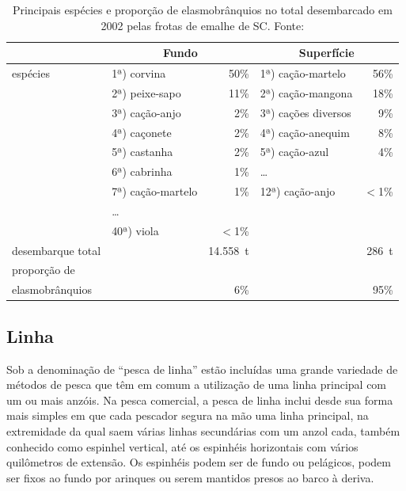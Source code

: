 \documentclass[a4paper,11pt,twoside,showtrims,onecolumn,openright,final]{memoir}
\begin{document}
\begin{table}
\caption[Principais espécies e proporção de elasmobrânquios no total desembarcado em 2002
         pelas frotas de emalhe de SC.]
	{Principais espécies e proporção de elasmobrânquios no total desembarcado em 2002
         pelas frotas de emalhe de SC. Fonte: \citet{univali2003}}
\label{tab:capturas-emalhe-sc}
\begin{center}
\begin{tabular*}{\textwidth}{l@{\extracolsep{\fill}}lrlr}
\toprule
		& \multicolumn{2}{c}{Fundo} & \multicolumn{2}{c}{Superfície} \\
\midrule
espécies 	& 1ª) corvina		& 50\%	& 1ª) cação-martelo	  & 56\%	\\
		& 2ª) peixe-sapo	& 11\%	& 2ª) cação-mangona	  & 18\%	\\
		& 3ª) cação-anjo	& 2\%	& 3ª) cações diversos	  & 9\%		\\
		& 4ª) caçonete		& 2\%	& 4ª) cação-anequim   	  & 8\%		\\
		& 5ª) castanha		& 2\%	& 5ª) cação-azul 	  & 4\%		\\
		& 6ª) cabrinha		& 1\%	& \ldots 		  &		\\
		& 7ª) cação-martelo	& 1\%	& 12ª) cação-anjo  	  & $<$1\%	\\
		& \ldots 		& 	&  			  &		\\
		& 40ª) viola		& $<$1\%&  		  	  & 		\\
\midrule
desembarque total & 			& 14.558~t& 			  & 286~t	\\
\midrule
proporção de	& 			&	& 			  & 		\\
elasmobrânquios	& 			& 6\%	& 			  & 95\%	\\
\bottomrule
\end{tabular*}
\end{center}
\end{table}


\subsection*{Linha}

Sob a denominação de ``pesca de linha'' estão incluídas uma grande variedade de métodos 
de pesca que têm em comum a utilização de uma linha principal com um ou mais anzóis. 
Na pesca comercial, a pesca de linha inclui desde sua forma mais simples em que cada pescador 
segura na mão uma linha principal, na extremidade da qual saem várias linhas secundárias 
com um anzol cada, também conhecido como espinhel vertical, até os espinhéis horizontais 
com vários quilômetros de extensão. Os espinhéis podem ser de fundo ou pelágicos, podem 
ser fixos ao fundo por arinques ou serem mantidos presos ao barco à deriva.
\end{document}
